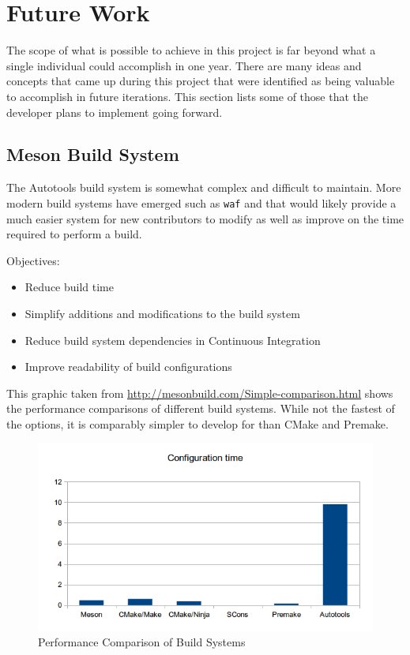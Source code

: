 \section{Future Work}\label{sec:future}

  The scope of what is possible to achieve in this project is far beyond what a
  single individual could accomplish in one year. There are many ideas and
  concepts that came up during this project that were identified as being
  valuable to accomplish in future iterations. This section lists some of those
  that the developer plans to implement going forward.

  \subsection{Meson Build System}\label{sec:future-meson}

    The Autotools build system is somewhat complex and difficult to maintain.
    More modern build systems have emerged such as \texttt{waf} and
     that would likely provide a much easier system for new
    contributors to modify as well as improve on the time required to perform a
    build.

    Objectives:

    \begin{itemize}
      \item Reduce build time
      \item Simplify additions and modifications to the build system
      \item Reduce build system dependencies in Continuous Integration
      \item Improve readability of build configurations
    \end{itemize}

    This graphic taken from \url{http://mesonbuild.com/Simple-comparison.html}
    shows the performance comparisons of different build systems. While not the
    fastest of the options, it is comparably simpler to develop for than CMake
    and Premake.

    \begin{figure}[H]
      \includegraphics[width=\textwidth]{figures/future/conftime}
      \caption{Performance Comparison of Build Systems}
      \label{fig:fut-meson-perf}
    \end{figure}

